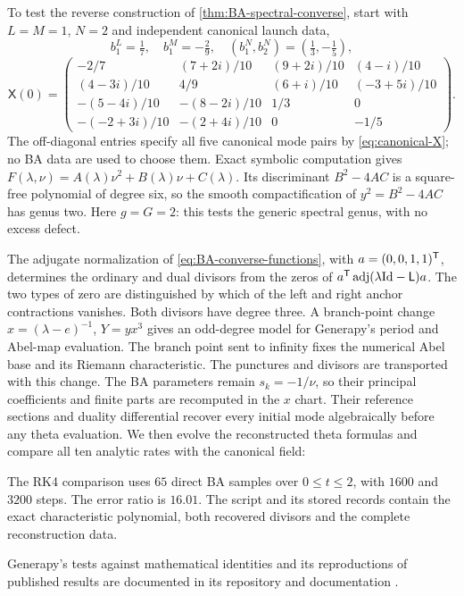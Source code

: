 To test the reverse construction of \cref{thm:BA-spectral-converse},
start with $L=M=1$, $N=2$ and independent canonical launch data,
\[
 b_1^L=\tfrac17,\quad b_1^M=-\tfrac29,\quad
 (b_1^N,b_2^N)=(\tfrac13,-\tfrac15),
\]
\[
 \mathsf X(0)=\begin{pmatrix}
 -2/7&(7+2i)/10&(9+2i)/10&(4-i)/10\\
 (4-3i)/10&4/9&(6+i)/10&(-3+5i)/10\\
 -(5-4i)/10&-(8-2i)/10&1/3&0\\
 -(-2+3i)/10&-(2+4i)/10&0&-1/5
 \end{pmatrix}.
\]
The off-diagonal entries specify all five canonical mode pairs by
\cref{eq:canonical-X}; no BA data are used to choose them.
Exact symbolic computation gives
$F(\lambda,\nu)=A(\lambda)\nu^2+B(\lambda)\nu+C(\lambda)$.
Its discriminant $B^2-4AC$ is a square-free polynomial of degree six,
so the smooth compactification of $y^2=B^2-4AC$ has genus two.
Here $g=G=2$:
this tests the generic spectral genus, with no excess defect.

The adjugate normalization of \cref{eq:BA-converse-functions}, with
$a=(0,0,1,1)^{\mathsf T}$, determines the ordinary and dual divisors
from the zeros of
$a^{\mathsf T}\operatorname{adj}(\lambda\mathrm{Id}-\mathsf L)a$.
The two types of zero are distinguished by which of the left and
right anchor contractions vanishes. Both divisors have degree three.
A branch-point change $x=(\lambda-e)^{-1}$, $Y=y x^3$ gives an
odd-degree model for Generapy's period and Abel-map evaluation.
The branch point sent to infinity fixes the numerical Abel base
and its Riemann characteristic. The punctures and divisors are transported with this change.
The BA parameters remain $s_k=-1/\nu$, so their principal
coefficients and finite parts are recomputed in the $x$ chart.
Their reference sections and duality differential recover every
initial mode algebraically before any theta evaluation. We then
evolve the reconstructed theta formulas and compare all ten analytic
rates with the canonical field:

The RK4 comparison uses $65$ direct BA samples over $0\leq t\leq2$,
with $1600$ and $3200$ steps. The error ratio is $16.01$.
The script  and its stored
records contain the exact characteristic polynomial, both recovered
divisors and the complete reconstruction data.

Generapy's tests against mathematical identities and its reproductions
of published results are documented in its repository and
documentation \cite{Generapy}.

